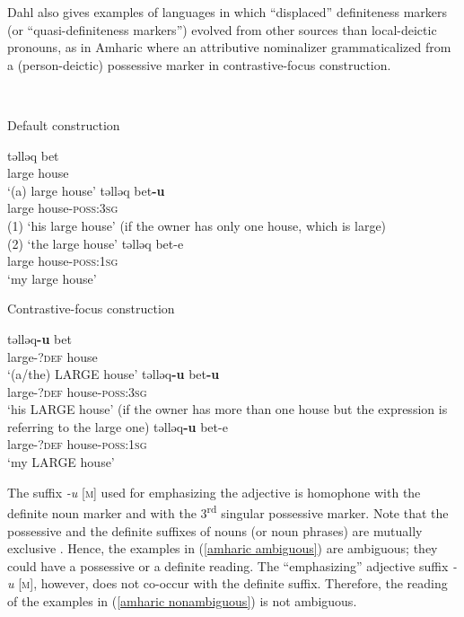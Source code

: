 {Dahl also gives examples of languages in which “displaced” definiteness markers (or “quasi-definiteness markers”) evolved from other sources than local-deictic pronouns, as in Amharic where an attributive nominalizer grammaticalized from a (person-deictic) possessive marker in contrastive-focus construction.
\begin{exe}
\ex	{}\\
\begin{xlist}
\ex	Default construction
\begin{xlist}
\ex
\gll	təlləq bet\\
	large	house\\								
\glt	‘(a) large house’
\ex	\label{amharic ambiguous}
\gll	təlləq bet\textbf{-u}\\
	large house-\textsc{poss:3sg}\\
\glt	(1) ‘his large house’ (if the owner has only one house, which is large)\\
	(2) ‘the large house’
\ex
\gll	təlləq bet-e\\
	large house-\textsc{poss:1sg}\\
\glt	‘my large house’
\end{xlist}
\ex	Contrastive-focus construction
\begin{xlist}
\ex	
\gll	təlləq\textbf{-u} bet\\
	large-\textsc{?def} house\\
\glt	‘(a/the) LARGE house’
\ex	\label{amharic nonambiguous}
\gll	təlləq\textbf{-u} bet\textbf{-u}\\
	large-\textsc{?def} house-\textsc{poss:3sg}\\
\glt	‘his LARGE house’ (if the owner has more than one house but the expression is referring to the large one)
\ex
\gll	təlləq\textbf{-u} bet-e\\
	large-\textsc{?def} house-\textsc{poss:1sg}\\
\glt	‘my LARGE house’
\end{xlist}
\end{xlist}
\end{exe}
The suffix \textit{-u} [\textsc{m}] used for emphasizing the adjective is homophone with the definite noun marker and with the 3\textsuperscript{rd} singular possessive marker. Note that the possessive and the definite suffixes of nouns (or noun phrases) are mutually exclusive \citep[463]{hudson1997}. Hence, the examples in (\ref{amharic ambiguous}) are ambiguous; they could have a possessive or a definite reading. The “emphasizing” adjective suffix \textit{-u} [\textsc{m}], however, does not co-occur with the definite suffix. Therefore, the reading of the examples in (\ref{amharic nonambiguous}) is not ambiguous.

}
